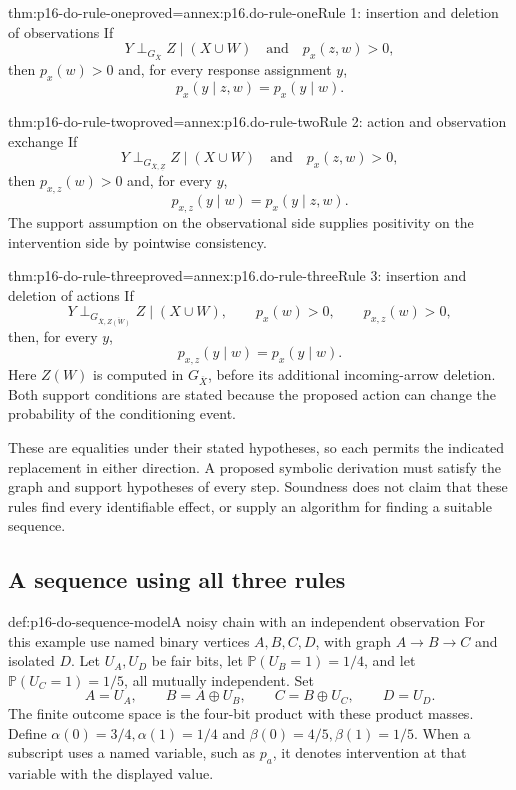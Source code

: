 \begin{hbtheorem}{thm:p16-do-rule-one}{proved=annex:p16.do-rule-one}{Rule 1: insertion and deletion of observations}
If
\[
 Y\mathrel{\perp_{G_{\overline X}}}Z\mid(X\cup W)
 \quad\text{and}\quad p_x(z,w)>0,
\]
then \(p_x(w)>0\) and, for every response assignment \(y\),
\[
 p_x(y\mid z,w)=p_x(y\mid w).
\]
\end{hbtheorem}

\begin{hbtheorem}{thm:p16-do-rule-two}{proved=annex:p16.do-rule-two}{Rule 2: action and observation exchange}
If
\[
 Y\mathrel{\perp_{G_{\overline X,\underline Z}}}Z\mid(X\cup W)
 \quad\text{and}\quad p_x(z,w)>0,
\]
then \(p_{x,z}(w)>0\) and, for every \(y\),
\[
 p_{x,z}(y\mid w)=p_x(y\mid z,w).
\]
The support assumption on the observational side supplies positivity
on the intervention side by pointwise consistency.
\end{hbtheorem}

\begin{hbtheorem}{thm:p16-do-rule-three}{proved=annex:p16.do-rule-three}{Rule 3: insertion and deletion of actions}
If
\[
 Y\mathrel{\perp_{G_{\overline X,\overline{Z(W)}}}}Z\mid(X\cup W),
 \qquad p_x(w)>0,\qquad p_{x,z}(w)>0,
\]
then, for every \(y\),
\[
 p_{x,z}(y\mid w)=p_x(y\mid w).
\]
Here \(Z(W)\) is computed in \(G_{\overline X}\), before its
additional incoming-arrow deletion. Both support conditions are stated
because the proposed action can change the probability of the
conditioning event.
\end{hbtheorem}

These are equalities under their stated hypotheses, so each permits
the indicated replacement in either direction. A proposed symbolic
derivation must satisfy the graph and support hypotheses of every
step. Soundness does not claim that these rules find every identifiable
effect, or supply an algorithm for finding a suitable sequence.

\subsection{A sequence using all three rules}

\begin{hbdefinition}{def:p16-do-sequence-model}{A noisy chain with an independent observation}
For this example use named binary vertices \(A,B,C,D\), with
graph \(A\to B\to C\) and isolated \(D\). Let \(U_A,U_D\)
be fair bits, let \(\mathbb P(U_B=1)=1/4\), and let
\(\mathbb P(U_C=1)=1/5\), all mutually independent. Set
\[
 A=U_A,\qquad B=A\oplus U_B,\qquad
 C=B\oplus U_C,\qquad D=U_D.
\]
The finite outcome space is the four-bit product with these product
masses. Define \(\alpha(0)=3/4,\alpha(1)=1/4\) and
\(\beta(0)=4/5,\beta(1)=1/5\).
When a subscript uses a named variable, such as \(p_a\), it denotes
intervention at that variable with the displayed value.
\end{hbdefinition}

